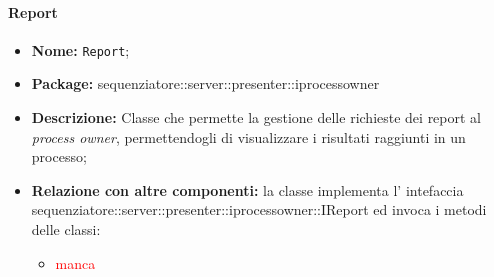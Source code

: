 \paragraph{Report}
	\begin{itemize}
		\item \textbf{Nome:} \texttt{Report};
		\item \textbf{Package:} sequenziatore::server::presenter::iprocessowner
		\item \textbf{Descrizione:} Classe che permette la gestione delle richieste dei report al \textit{process owner}, permettendogli di visualizzare i risultati raggiunti in un processo;
		\item \textbf{Relazione con altre componenti:} la classe implementa l' intefaccia sequenziatore::server::presenter::iprocessowner::IReport ed invoca i metodi delle classi:
		\begin{itemize}
			\item \textcolor{red}{manca}
		\end{itemize}
	\end{itemize}
